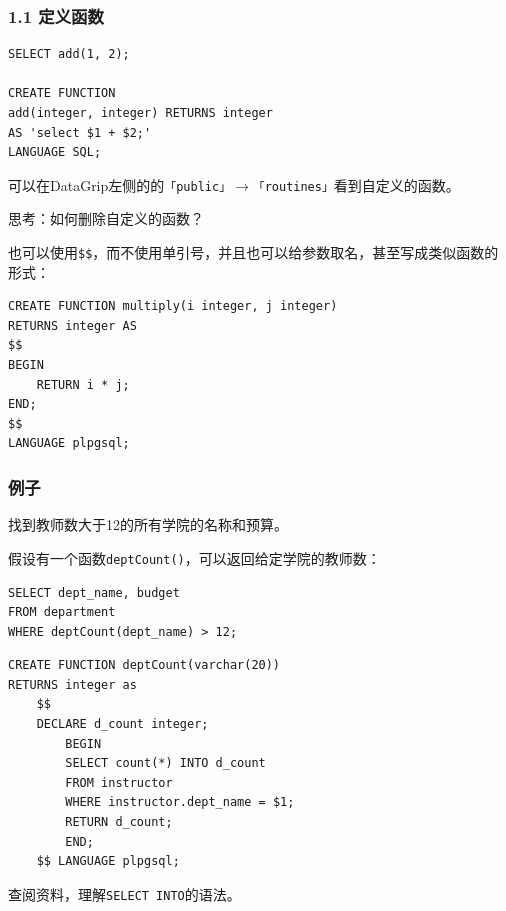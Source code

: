 \documentclass[aspectratio=169, 14pt]{beamer}
\begin{document}
\begin{frame}[fragile]
	\frametitle{1.1 定义函数}

	\begin{verbatim}
SELECT add(1, 2);

CREATE FUNCTION
add(integer, integer) RETURNS integer
AS 'select $1 + $2;'
LANGUAGE SQL;
    \end{verbatim}

	可以在DataGrip左侧的的\texttt{「public」}$\rightarrow$\alert{\texttt{「routines」}}看到自定义的函数。

	思考：如何删除自定义的函数？
\end{frame}


\begin{frame}[fragile]
	也可以使用\alert{\texttt{\$\$}}，而不使用单引号，并且也可以给参数取名，甚至写成类似函数的形式：

	\begin{verbatim}
CREATE FUNCTION multiply(i integer, j integer)
RETURNS integer AS
$$
BEGIN
    RETURN i * j;
END;
$$
LANGUAGE plpgsql;
\end{verbatim}

\end{frame}

\begin{frame}[fragile]
	\frametitle{例子}
	找到教师数大于12的所有学院的名称和预算。

	\pause

	假设有一个函数\alert{\texttt{deptCount()}}，可以返回给定学院的教师数：

	\begin{verbatim}
SELECT dept_name, budget
FROM department
WHERE deptCount(dept_name) > 12;
\end{verbatim}
\end{frame}

\begin{frame}[fragile]
	\begin{verbatim}
CREATE FUNCTION deptCount(varchar(20))
RETURNS integer as
    $$
    DECLARE d_count integer;
        BEGIN
        SELECT count(*) INTO d_count
        FROM instructor
        WHERE instructor.dept_name = $1;
        RETURN d_count;
        END;
    $$ LANGUAGE plpgsql;
    \end{verbatim}

	 查阅资料，理解\texttt{SELECT INTO}的语法。
\end{frame}
\end{document}

